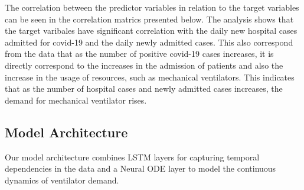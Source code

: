 \documentclass[lettersize, journal]{IEEEtran}
\begin{document}
The correlation between the predictor variables in relation to the target variables can be seen in the correlation matrics presented below. The analysis shows that the target varibales have significant correlation with the daily new hospital cases admitted for covid-19 and the daily newly admitted cases. This also correspond from the data that as the number of positive covid-19 cases increases, it is directly correspond to the increases in the admission of patients and also the increase in the usage of resources, such as mechanical ventilators. This indicates that as the number of hospital cases and newly admitted cases increases, the demand for mechanical ventilator rises.

\subsection{Model Architecture}
Our model architecture combines LSTM layers for capturing temporal dependencies in the data and a Neural ODE layer to model the continuous dynamics of ventilator demand.





\end{document}
